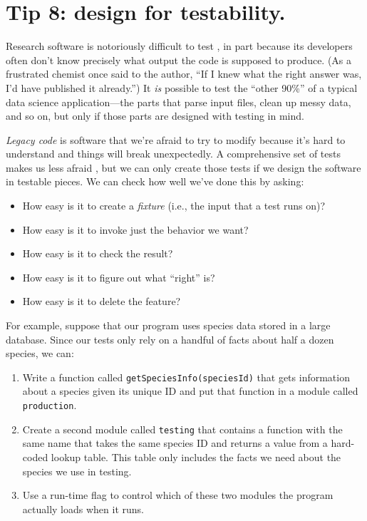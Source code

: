 \documentclass[10pt,letterpaper]{article}
\begin{document}
\section*{Tip 8: design for testability.}

Research software is notoriously difficult to test \cite{Hook2009,Kanewala2014},
in part because its developers often don't know precisely what output the code is supposed to produce.
(As a frustrated chemist once said to the author,
``If I knew what the right answer was, I'd have published it already.'')
It \emph{is} possible to test the ``other 90\%'' of a typical data science application---the parts that
parse input files,
clean up messy data,
and so on,
but only if those parts are designed with testing in mind.

\emph{Legacy code} is software that we're afraid to try to modify
because it's hard to understand and things will break unexpectedly.
A comprehensive set of tests makes us less afraid \cite{Feathers2004},
but we can only create those tests if we design the software in testable pieces.
We can check how well we've done this by asking:

\begin{itemize}
\item
  How easy is it to create a \emph{fixture}
  (i.e., the input that a test runs on)?
\item
  How easy is it to invoke just the behavior we want?
\item
  How easy is it to check the result?
\item
  How easy is it to figure out what ``right'' is?
\item
  How easy is it to delete the feature?
\end{itemize}

For example,
suppose that our program uses species data stored in a large database.
Since our tests only rely on a handful of facts about half a dozen species,
we can:

\begin{enumerate}
\item
  Write a function called \texttt{getSpeciesInfo(speciesId)}
  that gets information about a species given its unique ID
  and put that function in a module called \texttt{production}.
\item
  Create a second module called \texttt{testing}
  that contains a function with the same name
  that takes the same species ID
  and returns a value from a hard-coded lookup table.
  This table only includes the facts we need about the species we use in testing.
\item
  Use a run-time flag to control which of these two modules the program actually loads
  when it runs.
\end{enumerate}
\end{document}
